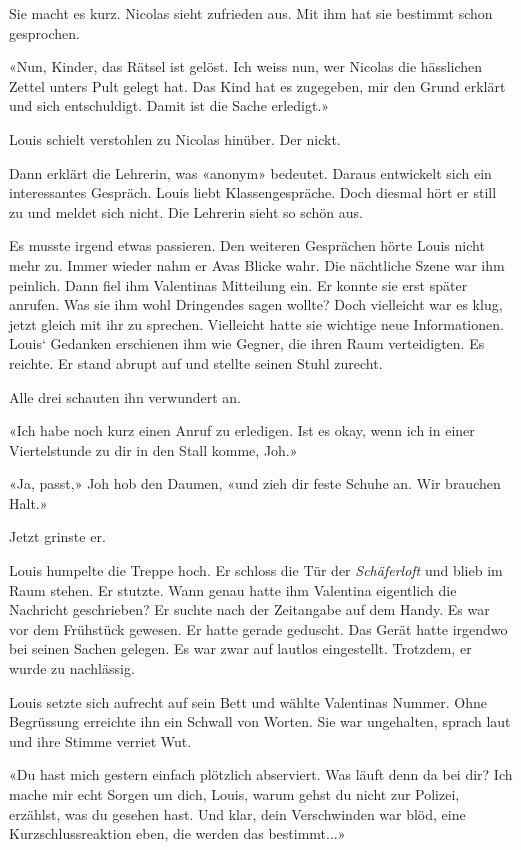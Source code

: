 Sie macht es kurz. Nicolas sieht zufrieden aus. Mit ihm hat sie bestimmt
schon gesprochen.

«Nun, Kinder, das Rätsel ist gelöst. Ich weiss nun, wer Nicolas die
hässlichen Zettel unters Pult gelegt hat. Das Kind hat es zugegeben, mir
den Grund erklärt und sich entschuldigt. Damit ist die Sache erledigt.»

Louis schielt verstohlen zu Nicolas hinüber. Der nickt.

Dann erklärt die Lehrerin, was «anonym» bedeutet. Daraus entwickelt sich
ein interessantes Gespräch. Louis liebt Klassengespräche. Doch diesmal
hört er still zu und meldet sich nicht. Die Lehrerin sieht so schön aus.

Es musste irgend etwas passieren. Den weiteren Gesprächen hörte Louis
nicht mehr zu. Immer wieder nahm er Avas Blicke wahr. Die nächtliche
Szene war ihm peinlich. Dann fiel ihm Valentinas Mitteilung ein. Er
konnte sie erst später anrufen. Was sie ihm wohl Dringendes sagen
wollte? Doch vielleicht war es klug, jetzt gleich mit ihr zu sprechen.
Vielleicht hatte sie wichtige neue Informationen. Louis` Gedanken
erschienen ihm wie Gegner, die ihren Raum verteidigten. Es reichte. Er
stand abrupt auf und stellte seinen Stuhl zurecht.

Alle drei schauten ihn verwundert an.

«Ich habe noch kurz einen Anruf zu erledigen. Ist es okay, wenn ich in
einer Viertelstunde zu dir in den Stall komme, Joh.»

«Ja, passt,» Joh hob den Daumen, «und zieh dir feste Schuhe an. Wir
brauchen Halt.»

Jetzt grinste er.

Louis humpelte die Treppe hoch. Er schloss die Tür der
\emph{Schäferloft} und blieb im Raum stehen. Er stutzte. Wann genau
hatte ihm Valentina eigentlich die Nachricht geschrieben? Er suchte nach
der Zeitangabe auf dem Handy. Es war vor dem Frühstück gewesen. Er hatte
gerade geduscht. Das Gerät hatte irgendwo bei seinen Sachen gelegen. Es
war zwar auf lautlos eingestellt. Trotzdem, er wurde zu nachlässig.

Louis setzte sich aufrecht auf sein Bett und wählte Valentinas Nummer.
Ohne Begrüssung erreichte ihn ein Schwall von Worten. Sie war
ungehalten, sprach laut und ihre Stimme verriet Wut.

«Du hast mich gestern einfach plötzlich abserviert. Was läuft denn da
bei dir? Ich mache mir echt Sorgen um dich, Louis, warum gehst du nicht
zur Polizei, erzählst, was du gesehen hast. Und klar, dein Verschwinden
war blöd, eine Kurzschlussreaktion eben, die werden das bestimmt...»

